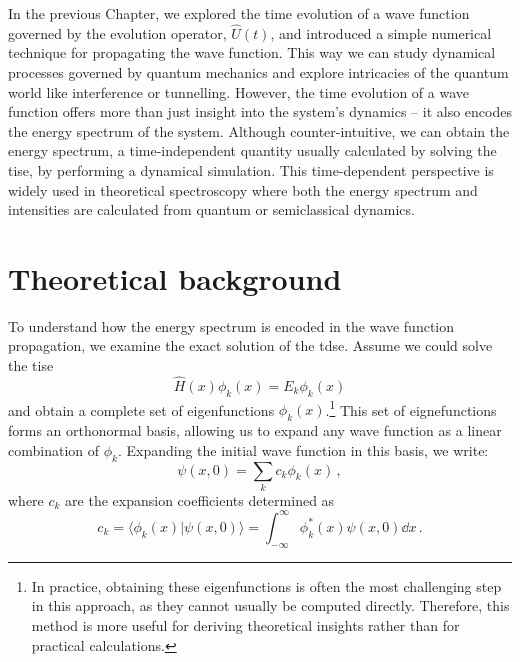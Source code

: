 In the previous Chapter, we explored the time evolution of a wave function governed by the evolution operator, $\hat{U}(t)$, and introduced a simple numerical technique for propagating the wave function. This way we can study dynamical processes governed by quantum mechanics and explore intricacies of the quantum world like interference or tunnelling. However, the time evolution of a wave function offers more than just insight into the system's dynamics -- it also encodes the energy spectrum of the system. Although counter-intuitive, we can obtain the energy spectrum, a time-independent quantity usually calculated by solving the \acrfull{tise}, by performing a dynamical simulation. This time-dependent perspective is widely used in theoretical spectroscopy where both the energy spectrum and intensities are calculated from quantum or semiclassical dynamics.

\section{Theoretical background}
\label{sec:autocorrintro}

To understand how the energy spectrum is encoded in the wave function propagation, we examine the exact solution of the \acrlong{tdse}. Assume we could solve the \acrshort{tise}
\begin{equation}
    \hat{H}(x) \phi_k(x) = E_k \phi_k(x)
    \label{eq:tise0}
\end{equation}
and obtain a complete set of eigenfunctions $\phi_k(x)$.\footnote{In practice, obtaining these eigenfunctions is often the most challenging step in this approach, as they cannot usually be computed directly. Therefore, this method is more useful for deriving theoretical insights rather than for practical calculations.} This set of eignefunctions forms an orthonormal basis, allowing us to expand any wave function as a linear combination of $\phi_k$. Expanding the initial wave function in this basis, we write:
\begin{equation}
    \psi(x,0) = \sum_k c_k \phi_k(x) \, ,
\end{equation}
where $c_k$ are the expansion coefficients determined as 
\begin{equation}
    c_k = \langle \phi_k(x) | \psi(x,0) \rangle = \int_{-\infty}^\infty \phi_k^*(x) \psi(x,0) \dd x \, .
    \label{eq:psi0v1}
\end{equation}

